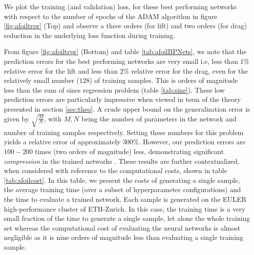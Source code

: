 \documentclass[a4paper]{article}
\numberwithin{equation}{section}
\numberwithin{equation}{section}
\theoremstyle{definition}
\theoremstyle{myremarkstyle}
\begin{document}
We plot the training (and validation) loss, for these best performing networks with respect to the number of epochs of the ADAM algorithm in figure \ref{fig:afoiltrpr} (Top) and observe a three orders (for lift) and two orders (for drag) reduction in the underlying loss function during training.

From figure \ref{fig:afoiltrpr} (Bottom) and table \ref{tab:afoilBPNets}, we note that the prediction errors for the best performing networks are very small i.e, less than $1\%$ relative error for the lift and less than $2\%$ relative error for the drag, even for the relatively small number ($128$) of training samples. This is orders of magnitude less than the sum of sines regression problem (table \ref{tab:sine}). These low prediction errors are particularly impressive when viewed in term of the theory presented in section \ref{sec:theo}. A crude upper bound on the generalization error is given by $\sqrt{\frac{M}{N}}$, with $M,N$ being the number of parameters in the network and number of training samples respectively. Setting these numbers for this problem yields a relative error of approximately $300 \%$. However, our prediction errors are $100-200$ times (two orders of magnitude) less, demonstrating significant \emph{compression} in the trained networks \cite{Arora}. These results are further contextualized, when considered with reference to the computational costs, shown in table \ref{tab:afoilcost}. In this table, we present the costs of generating a single sample, the average training time (over a subset of hyperparameter configurations) and the time to evaluate a trained network. Each sample is generated on the EULER high-performance cluster of ETH-Zurich. In this case, the training time is a very small fraction of the time to generate a single sample, let alone the whole training set whereas the computational cost of evaluating the neural networks is almost negligible as it is nine orders of magnitude less than evaluating a single training sample. 
\end{document}
